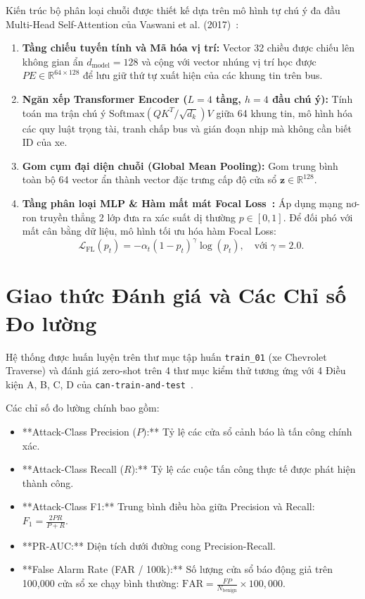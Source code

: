 \documentclass[12pt, a4paper, reqno, oneside]{book}
\begin{document}
Kiến trúc bộ phân loại chuỗi được thiết kế dựa trên mô hình tự chú ý đa đầu Multi-Head Self-Attention của Vaswani et al. (2017)~\cite{vaswani2017attention}:
\begin{enumerate}
    \item \textbf{Tầng chiếu tuyến tính và Mã hóa vị trí:} Vector 32 chiều được chiếu lên không gian ẩn $d_{\text{model}} = 128$ và cộng với vector nhúng vị trí học được $PE \in \mathbb{R}^{64 \times 128}$ để lưu giữ thứ tự xuất hiện của các khung tin trên bus.
    \item \textbf{Ngăn xếp Transformer Encoder ($L = 4$ tầng, $h = 4$ đầu chú ý):} Tính toán ma trận chú ý $\text{Softmax}(QK^T/\sqrt{d_k})V$ giữa 64 khung tin, mô hình hóa các quy luật trọng tài, tranh chấp bus và gián đoạn nhịp mà không cần biết ID của xe.
    \item \textbf{Gom cụm đại diện chuỗi (Global Mean Pooling):} Gom trung bình toàn bộ 64 vector ẩn thành vector đặc trưng cấp độ cửa sổ $\mathbf{z} \in \mathbb{R}^{128}$.
    \item \textbf{Tầng phân loại MLP \& Hàm mất mát Focal Loss~\cite{lin2017focal}:} Áp dụng mạng nơ-ron truyền thẳng 2 lớp đưa ra xác suất dị thường $p \in [0, 1]$. Để đối phó với mất cân bằng dữ liệu, mô hình tối ưu hóa hàm Focal Loss:
    \begin{equation}
        \mathcal{L}_{\text{FL}}(p_t) = -\alpha_t (1 - p_t)^\gamma \log(p_t), \quad \text{với } \gamma = 2.0.
    \end{equation}
\end{enumerate}

\section{Giao thức Đánh giá và Các Chỉ số Đo lường}
\label{sec:method_eval}

Hệ thống được huấn luyện trên thư mục tập huấn \texttt{train\_01} (xe Chevrolet Traverse) và đánh giá zero-shot trên 4 thư mục kiểm thử tương ứng với 4 Điều kiện A, B, C, D của \texttt{can-train-and-test}~\cite{lampe2024curated}.

Các chỉ số đo lường chính bao gồm:
\begin{itemize}
    \item **Attack-Class Precision ($P$):** Tỷ lệ các cửa sổ cảnh báo là tấn công chính xác.
    \item **Attack-Class Recall ($R$):** Tỷ lệ các cuộc tấn công thực tế được phát hiện thành công.
    \item **Attack-Class F1:** Trung bình điều hòa giữa Precision và Recall: $F_1 = \frac{2PR}{P + R}$.
    \item **PR-AUC:** Diện tích dưới đường cong Precision-Recall.
    \item **False Alarm Rate (FAR / 100k):** Số lượng cửa sổ báo động giả trên 100,000 cửa sổ xe chạy bình thường: $\text{FAR} = \frac{FP}{N_{\text{benign}}} \times 100,000$.
\end{itemize}
\end{document}
